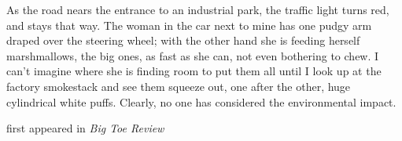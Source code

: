 As the road nears the entrance to an industrial park, the traffic light
turns red, and stays that way. The woman in the car next to mine has one
pudgy arm draped over the steering wheel; with the other hand she is
feeding herself marshmallows, the big ones, as fast as she can, not even
bothering to chew. I can't imagine where she is finding room to put them
all until I look up at the factory smokestack and see them squeeze out,
one after the other, huge cylindrical white puffs. Clearly, no one has
considered the environmental impact.

first appeared in \emph{Big Toe Review}
